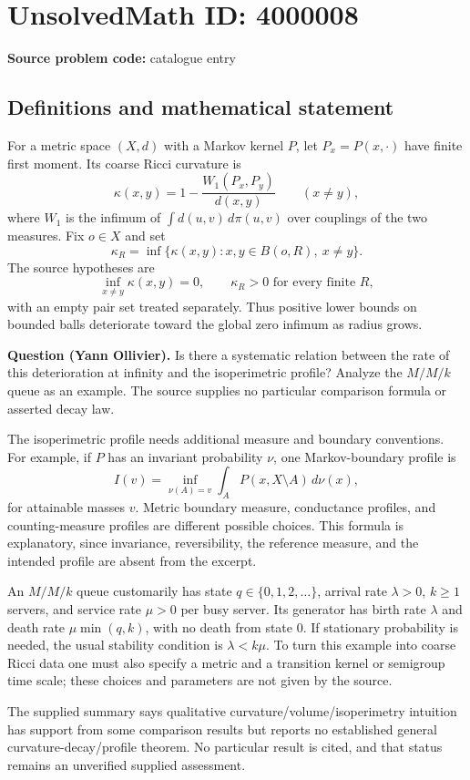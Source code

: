 \documentclass[11pt]{article}
\begin{document}
\section*{UnsolvedMath ID: 4000008}
\textbf{Source problem code:} catalogue entry
\subsection{Definitions and mathematical statement}
For a metric space $(X,d)$ with a Markov kernel $P$, let $P_x=P(x,\cdot)$ have finite first moment. Its coarse Ricci curvature is
\[
 \kappa(x,y)=1-\frac{W_1(P_x,P_y)}{d(x,y)}\qquad(x\ne y),
\]
where $W_1$ is the infimum of $\int d(u,v)\,d\pi(u,v)$ over couplings of the two measures. Fix $o\in X$ and set
\[
 \kappa_R=\inf\{\kappa(x,y):x,y\in B(o,R),\ x\ne y\}.
\]
The source hypotheses are
\[
 \inf_{x\ne y}\kappa(x,y)=0,\qquad \kappa_R>0\text{ for every finite }R,
\]
with an empty pair set treated separately. Thus positive lower bounds on bounded balls deteriorate toward the global zero infimum as radius grows.

\textbf{Question (Yann Ollivier).} Is there a systematic relation between the rate of this deterioration at infinity and the isoperimetric profile? Analyze the $M/M/k$ queue as an example. The source supplies no particular comparison formula or asserted decay law.

The isoperimetric profile needs additional measure and boundary conventions. For example, if $P$ has an invariant probability $\nu$, one Markov-boundary profile is
\[
 I(v)=\inf_{\nu(A)=v}\int_A P(x,X\setminus A)\,d\nu(x),
\]
for attainable masses $v$. Metric boundary measure, conductance profiles, and counting-measure profiles are different possible choices. This formula is explanatory, since invariance, reversibility, the reference measure, and the intended profile are absent from the excerpt.

An $M/M/k$ queue customarily has state $q\in\{0,1,2,\ldots\}$, arrival rate $\lambda>0$, $k\geq1$ servers, and service rate $\mu>0$ per busy server. Its generator has birth rate $\lambda$ and death rate $\mu\min(q,k)$, with no death from state $0$. If stationary probability is needed, the usual stability condition is $\lambda<k\mu$. To turn this example into coarse Ricci data one must also specify a metric and a transition kernel or semigroup time scale; these choices and parameters are not given by the source.

The supplied summary says qualitative curvature/volume/isoperimetry intuition has support from some comparison results but reports no established general curvature-decay/profile theorem. No particular result is cited, and that status remains an unverified supplied assessment.
\end{document}
